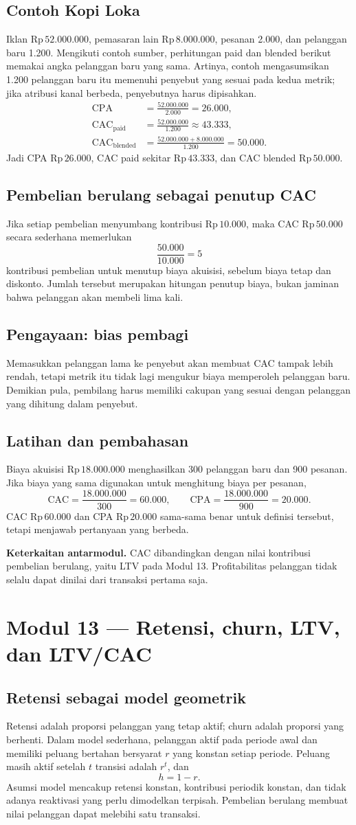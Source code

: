 \documentclass[11pt,a4paper]{article}
\newcommand{\modul}[2]{\clearpage\section{Modul #1 --- #2}}
\newcommand{\bagian}[1]{\Needspace{5\baselineskip}\subsection{#1}}
\newcommand{\jembatan}[1]{\par\textbf{Keterkaitan antarmodul.} #1\par}
\newcommand{\CPA}{\mathrm{CPA}}
\newcommand{\CAC}{\mathrm{CAC}}
\newcommand{\rp}[1]{\ensuremath{\mathrm{Rp}\,#1}}
\begin{document}
\bagian{Contoh Kopi Loka}
Iklan \rp{52.000.000}, pemasaran lain \rp{8.000.000}, pesanan 2.000, dan pelanggan baru 1.200. Mengikuti contoh sumber, perhitungan paid dan blended berikut memakai angka pelanggan baru yang sama. Artinya, contoh mengasumsikan 1.200 pelanggan baru itu memenuhi penyebut yang sesuai pada kedua metrik; jika atribusi kanal berbeda, penyebutnya harus dipisahkan.
\[
\begin{aligned}
\CPA&=\frac{52.000.000}{2.000}=26.000,\\
\CAC_{\text{paid}}&=\frac{52.000.000}{1.200}\approx43.333,\\
\CAC_{\text{blended}}&=\frac{52.000.000+8.000.000}{1.200}=50.000.
\end{aligned}
\]
Jadi CPA \rp{26.000}, CAC paid sekitar \rp{43.333}, dan CAC blended \rp{50.000}.

\bagian{Pembelian berulang sebagai penutup CAC}
Jika setiap pembelian menyumbang kontribusi \rp{10.000}, maka CAC \rp{50.000} secara sederhana memerlukan
\[
\frac{50.000}{10.000}=5
\]
kontribusi pembelian untuk menutup biaya akuisisi, sebelum biaya tetap dan diskonto. Jumlah tersebut merupakan hitungan penutup biaya, bukan jaminan bahwa pelanggan akan membeli lima kali.

\bagian{Pengayaan: bias pembagi}
Memasukkan pelanggan lama ke penyebut akan membuat CAC tampak lebih rendah, tetapi metrik itu tidak lagi mengukur biaya memperoleh pelanggan baru. Demikian pula, pembilang harus memiliki cakupan yang sesuai dengan pelanggan yang dihitung dalam penyebut.

\bagian{Latihan dan pembahasan}
Biaya akuisisi \rp{18.000.000} menghasilkan 300 pelanggan baru dan 900 pesanan. Jika biaya yang sama digunakan untuk menghitung biaya per pesanan,
\[
\CAC=\frac{18.000.000}{300}=60.000,\qquad
\CPA=\frac{18.000.000}{900}=20.000.
\]
CAC \rp{60.000} dan CPA \rp{20.000} sama-sama benar untuk definisi tersebut, tetapi menjawab pertanyaan yang berbeda.
\jembatan{CAC dibandingkan dengan nilai kontribusi pembelian berulang, yaitu LTV pada Modul 13. Profitabilitas pelanggan tidak selalu dapat dinilai dari transaksi pertama saja.}

\modul{13}{Retensi, churn, LTV, dan LTV/CAC}
\bagian{Retensi sebagai model geometrik}
Retensi adalah proporsi pelanggan yang tetap aktif; churn adalah proporsi yang berhenti. Dalam model sederhana, pelanggan aktif pada periode awal dan memiliki peluang bertahan bersyarat \(r\) yang konstan setiap periode. Peluang masih aktif setelah \(t\) transisi adalah \(r^t\), dan
\[
h=1-r.
\]
Asumsi model mencakup retensi konstan, kontribusi periodik konstan, dan tidak adanya reaktivasi yang perlu dimodelkan terpisah. Pembelian berulang membuat nilai pelanggan dapat melebihi satu transaksi.
\end{document}
